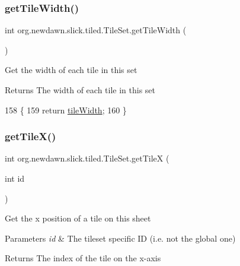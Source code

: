 \subsubsection{\texorpdfstring{get\+Tile\+Width()}{getTileWidth()}}
{\footnotesize\ttfamily int org.\+newdawn.\+slick.\+tiled.\+Tile\+Set.\+get\+Tile\+Width (\begin{DoxyParamCaption}{ }\end{DoxyParamCaption})\hspace{0.3cm}{\ttfamily [inline]}}

Get the width of each tile in this set

\begin{DoxyReturn}{Returns}
The width of each tile in this set 
\end{DoxyReturn}

\begin{DoxyCode}
158                               \{
159         \textcolor{keywordflow}{return} \mbox{\hyperlink{classorg_1_1newdawn_1_1slick_1_1tiled_1_1_tile_set_a12995a46982fc8ddc47b517dc500e376}{tileWidth}};
160     \}
\end{DoxyCode}
\mbox{\label{classorg_1_1newdawn_1_1slick_1_1tiled_1_1_tile_set_aa0db1dfc806d1bba3c0628a761c7265e}} 
\subsubsection{\texorpdfstring{get\+Tile\+X()}{getTileX()}}
{\footnotesize\ttfamily int org.\+newdawn.\+slick.\+tiled.\+Tile\+Set.\+get\+TileX (\begin{DoxyParamCaption}\item[{int}]{id }\end{DoxyParamCaption})\hspace{0.3cm}{\ttfamily [inline]}}

Get the x position of a tile on this sheet


\begin{DoxyParams}{Parameters}
{\em id} & The tileset specific ID (i.\+e. not the global one) \\
\hline
\end{DoxyParams}
\begin{DoxyReturn}{Returns}
The index of the tile on the x-\/axis 
\end{DoxyReturn}

